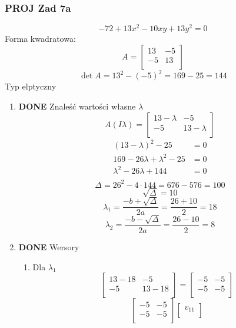 \documentclass[11pt]{article}
\begin{document}
\subsubsection{{\bfseries\sffamily PROJ} Zad 7a}
\label{sec:org21ee526}
\[-72 + 13 x^{2} - 10xy + 13y^{2} = 0\]
Forma kwadratowa:
\[A = \begin{bmatrix}
        13 & -5\\
        -5 & 13\\
      \end{bmatrix}\]
\[\det A = 13^2 - {(-5)}^{2}
  = 169 - 25
  = 144\]
Typ elptyczny
\begin{enumerate}
\item {\bfseries\sffamily DONE} Znaleść wartości własne \(\lambda\)
\label{sec:orge4cfbc0}
\[A (I\lambda) = \begin{bmatrix}
        13 - \lambda & -5\\
        -5 & 13 - \lambda \\
      \end{bmatrix}\]
\begin{align*}
  {(13 - \lambda)}^{2} - 25 &= 0\\
  169 - 26 \lambda + {\lambda}^{2} - 25 &= 0 \\
  {\lambda}^{2} - 26 \lambda + 144 &= 0\\
\end{align*}
\[\Delta = 26^{2} - 4 \cdot 144 = 676 - 576 = 100\]
\[\sqrt{\Delta} = 10\]
\[\lambda_1 = \frac{-b + \sqrt{\Delta}}{2a}
= \frac{26 + 10}{2} = 18\]
\[\lambda_2 = \frac{-b - \sqrt{\Delta}}{2a}
= \frac{26 - 10}{2} = 8\]
\item {\bfseries\sffamily DONE} Wersory
\label{sec:org247fa08}
\begin{enumerate}
\item Dla \(\lambda_1\)
\label{sec:org25f8af3}
\[\begin{bmatrix}
  13 - 18 & -5\\
  -5 & 13 - 18\\
\end{bmatrix}
=
\begin{bmatrix}
  -5 & -5\\
  -5 & -5\\
\end{bmatrix}\]
\[\begin{bmatrix}
    -5 & -5\\
    -5 & -5\\
  \end{bmatrix}
  \begin{bmatrix}
    v_{11}\\

\end{bmatrix}\]
\end{enumerate}
\end{enumerate}
\end{document}
